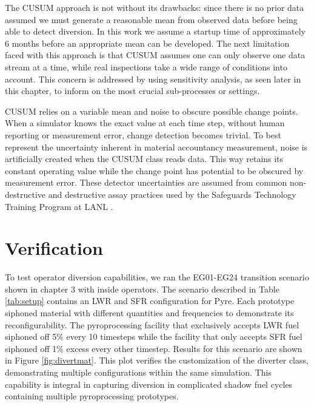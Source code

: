 The CUSUM approach is not without its drawbacks: since there is no prior data assumed we must generate a reasonable mean from observed data before being able to detect diversion. In this work
we assume a startup time of approximately 6 months before an appropriate mean can be developed. The next limitation faced with this approach is that CUSUM assumes one can only observe one data stream at a time, while
real inspections take a wide range of conditions into account. This concern is addressed by using sensitivity analysis, as seen later in this chapter, to inform on the most crucial
sub-processes or settings. 

CUSUM relies on a variable mean and noise to obscure possible change points. When a simulator knows the exact value at each time step, without human reporting or measurement error, change 
detection becomes trivial. To best represent the uncertainty inherent in material accountancy measurement, noise is artificially created when the CUSUM class reads data. This way \Cyclus retains its constant operating value while the change point
has potential to be obscured by measurement error. These detector uncertainties are assumed from common non-destructive and destructive assay practices used by the Safeguards Technology Training Program at LANL \cite{root_see_2019}.

\section{Verification}

To test operator diversion capabilities, we ran the EG01-EG24 transition scenario shown in chapter 3 with inside operators. The scenario described in Table \ref{tab:setup} contains an LWR and SFR configuration for Pyre. Each prototype siphoned material with different quantities and frequencies to demonstrate its reconfigurability. The pyroprocessing facility that exclusively accepts LWR fuel siphoned off 5\% every 10 timesteps while the facility that only accepts SFR fuel siphoned off 1\% excess every other timestep.  Results for this scenario are shown in Figure \ref{fig:divertmat}. This plot verifies the customization of the diverter class, demonstrating multiple configurations within the same simulation. This capability is integral in capturing diversion in complicated shadow fuel cycles containing multiple pyroprocessing prototypes.

